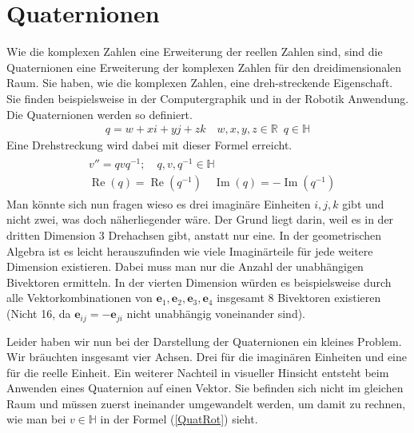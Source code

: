 %
%
%
\section{Quaternionen}

Wie die komplexen Zahlen eine Erweiterung der reellen Zahlen sind, sind die Quaternionen eine Erweiterung der komplexen Zahlen für den dreidimensionalen Raum. Sie haben, wie die komplexen Zahlen, eine dreh-streckende Eigenschaft.
Sie finden beispielsweise in der Computergraphik und in der Robotik Anwendung.
Die Quaternionen werden so definiert.
\begin{align}
	q = w + xi + yj + zk \quad w,x,y,z \in \mathbb{R}\enspace q \in \mathbb{H}
\end{align}
Eine Drehstreckung wird dabei mit dieser Formel erreicht. 
\begin{align} \label{QuatRot}
	\begin{split} 
		&v'' = qvq^{-1};\quad q,v,q^{-1} \in \mathbb{H}\\
		&\operatorname{Re}(q) = \operatorname{Re}(q^{-1})\quad \operatorname{Im}(q) = -\operatorname{Im}(q^{-1})
	\end{split}
\end{align}
Man könnte sich nun fragen wieso es drei imaginäre Einheiten $i,j,k$ gibt und nicht zwei, was doch näherliegender wäre. Der Grund liegt darin, weil es in der dritten Dimension 3 Drehachsen gibt, anstatt nur eine. In der geometrischen Algebra ist es leicht herauszufinden wie viele Imaginärteile für jede weitere Dimension existieren. Dabei muss man nur die Anzahl der unabhängigen Bivektoren ermitteln. In der vierten Dimension würden es beispielsweise durch alle Vektorkombinationen von $\mathbf{e}_1, \mathbf{e}_2,\mathbf{e}_3, \mathbf{e}_4$ insgesamt 8 Bivektoren existieren (Nicht 16, da $\mathbf{e}_{ij} = -\mathbf{e}_{ji}$ nicht unabhängig voneinander sind).

Leider haben wir nun bei der Darstellung der Quaternionen ein kleines Problem. Wir bräuchten insgesamt vier Achsen. Drei für die imaginären Einheiten und eine für die reelle Einheit. Ein weiterer Nachteil in visueller Hinsicht entsteht beim Anwenden eines Quaternion auf einen Vektor. Sie befinden sich nicht im gleichen Raum und müssen zuerst ineinander umgewandelt werden, um damit zu rechnen, wie man bei $v \in \mathbb{H}$ in der Formel (\ref{QuatRot}) sieht.

